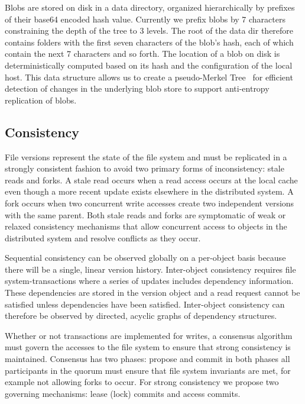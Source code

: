 \documentclass[letterpaper,twocolumn,10pt]{article}
\begin{document}
Blobs are stored on disk in a data directory, organized hierarchically by
prefixes of their base64 encoded hash value.
Currently we prefix blobs by 7 characters constraining the depth of the tree
to 3 levels.
The root of the data dir therefore contains folders with the first seven
characters of the blob's hash, each of which contain the next 7 characters
and so forth.
The location of a blob on disk is deterministically computed based on its
hash and the configuration of the local host.
This data structure allows us to create a pseudo-Merkel
Tree~\cite{merkle_digital_1987} for efficient detection of changes in the
underlying blob store to support anti-entropy replication of blobs.

\subsection*{Consistency}

File versions represent the state of the file system and must be replicated
in a strongly consistent fashion to avoid two primary forms of inconsistency:
stale reads and forks.
A stale read occurs when a read access occurs at the local cache even though
a more recent update exists elsewhere in the distributed system.
A fork occurs when two concurrent write accesses create two independent
versions with the same parent.
Both stale reads and forks are symptomatic of weak or relaxed consistency
mechanisms that allow concurrent access to objects in the distributed system
and resolve conflicts as they occur.

Sequential consistency can be observed globally on a per-object basis because
there will be a single, linear version history.
Inter-object consistency requires file system-transactions where a series of
updates includes dependency information.
These dependencies are stored in the version object and a read request cannot
be satisfied unless dependencies have been satisfied.
Inter-object consistency can therefore be observed by directed, acyclic
graphs of dependency structures.

Whether or not transactions are implemented for writes, a consensus algorithm
must govern the accesses to the file system to ensure that strong consistency
is maintained.
Consensus has two phases: propose and commit in both phases all participants
in the quorum must ensure that file system invariants are met, for example
not allowing forks to occur.
For strong consistency we propose two governing mechanisms: lease (lock)
commits and access commits.
\end{document}
